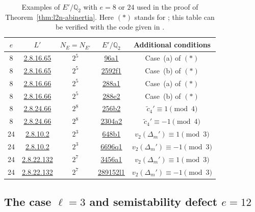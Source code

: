 \documentclass[12pt]{amsart}
\numberwithin{equation}{section}
\theoremstyle{definition}
\newcommand{\Q}{\mathbb{Q}}
\newcommand{\LMFDBE}[1]{\href{https://www.lmfdb.org/EllipticCurve/Q/#1}{\textsf{#1}}}
\newcommand{\LMFDBL}[1]{\href{https://www.lmfdb.org/padicField/#1}{\textsf{#1}}}
\begin{document}
\begin{table}[h]
    \centering
    \begin{tabular}{|c||c|c|c|c|}
        \hline
        $e$ & $L'$ & $N_E = N_{E'}$ & $E'/\Q_2$ & Additional  conditions  \\ \hline
        8& \LMFDBL{2.8.16.65} &$2^5$ & \LMFDBE{96a1} & Case~(a) of $(*)$
        \\ \hline
        8& \LMFDBL{2.8.16.65} & $2^5$&  \LMFDBE{2592f1}& Case~(b) of $(*)$
        \\ \hline
           8&\LMFDBL{2.8.16.66} & $2^5$&\LMFDBE{288a1} & Case~(a) of $(*)$
           \\ \hline
        8&\LMFDBL{2.8.16.66} & $2^5$& \LMFDBE{288e2}& Case~(b) of $(*)$\\ \hline
        8&\LMFDBL{2.8.24.66} & $2^8$& \LMFDBE{256b2} & $\tilde{c}_4'\equiv 1\pmod4$ \\ \hline
        8& \LMFDBL{2.8.24.66}& $2^8$& \LMFDBE{2304a2} &$\tilde{c}_4'\equiv -1\pmod4$ \\ \hline
        24& \LMFDBL{2.8.10.2} &$2^3$& \LMFDBE{648b1} & $v_2(\Delta_m' )\equiv 1\pmod 3$\\ \hline
        24& \LMFDBL{2.8.10.2} &$2^3$ & \LMFDBE{6696q1} & $v_2(\Delta_m' )\equiv -1\pmod 3$\\ \hline
        24& \LMFDBL{2.8.22.132}  &$2^7$ & \LMFDBE{3456a1} & $v_2(\Delta_m' )\equiv 1\pmod 3$\\ \hline
        24& \LMFDBL{2.8.22.132}   &$2^7$ & \LMFDBE{289152l1} & $v_2(\Delta_m' )\equiv -1\pmod 3$\\ \hline
    \end{tabular}
    \caption{Examples of $E'/\Q_2$ with $e=8$ or $24$ used in the proof of Theorem~\ref{thm:l2n-abinertia}. Here $(*)$ stands for \cite[Table 4]{symplectic}; this table can be verified with the code given in \cite{git}.}
    \label{tab:l2examples}
\end{table}

\subsection{The case \texorpdfstring{$\ell=3$ and semistability defect $e=12$}{}}
\end{document}

